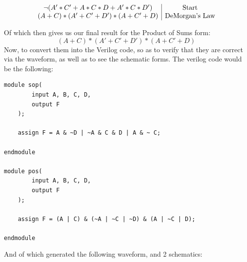 \begin{centering}
  \begin{displaymath}
  \begin{array}{c | c}
    \neg(A'*C' + A*C*D + A'*C*D') & $Start$ \\
    (A + C) * (A' + C' + D') * (A + C' + D) & $DeMorgan's Law$ \\
  \end{array}
  \end{displaymath}
\end{centering}
Of which then gives us our final result for the Product of Sums form:
$$ (A + C) * (A' + C' + D') * (A + C' + D) $$
Now, to convert them into the Verilog code, so as to verify that they are correct via the waveform, as well as to see the schematic forms. The verilog code would be the following:
\begin{lstlisting}[caption={Part 5 Verilog Code}, label={Part 5 Verilog}, style=Verilog]
module sop(
        input A, B, C, D,
        output F
    );
   
    assign F = A & ~D | ~A & C & D | A & ~ C;

endmodule

module pos(
        input A, B, C, D,
        output F
    );
   
    assign F = (A | C) & (~A | ~C | ~D) & (A | ~C | D);

endmodule
\end{lstlisting}
And of which generated the following waveform, and 2 schematics:
\begin{figure}[!htbp]
    \centering
\end{figure}\newline
\begin{figure}[!htbp]
    \centering
    \qquad
\end{figure}\newpage
